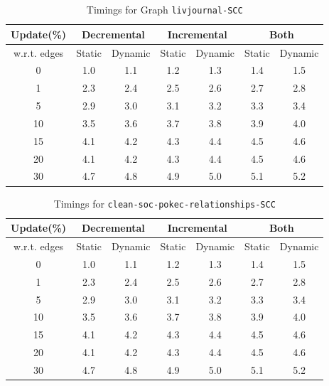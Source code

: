 \begin{table}[H]
    \centering
    \caption{Timings for Graph \texttt{livjournal-SCC} }
    \begin{tabular}{|c|c|c|c|c|c|c|}
        \hline
        \textbf{Update(\%)} & \multicolumn{2}{c|}{\textbf{Decremental}} & \multicolumn{2}{c|}{\textbf{Incremental}} & \multicolumn{2}{c|}{\textbf{Both}} \\
        \hline
        w.r.t. edges & Static &  Dynamic & Static & Dynamic & Static & Dynamic \\
        \hline
        0 & 1.0 & 1.1 & 1.2 & 1.3 & 1.4 & 1.5 \\
        1 & 2.3 & 2.4 & 2.5 & 2.6 & 2.7 & 2.8 \\
        5 & 2.9 & 3.0 & 3.1 & 3.2 & 3.3 & 3.4 \\
        10 & 3.5 & 3.6 & 3.7 & 3.8 & 3.9 & 4.0 \\
        15 & 4.1 & 4.2 & 4.3 & 4.4 & 4.5 & 4.6 \\
        20 & 4.1 & 4.2 & 4.3 & 4.4 & 4.5 & 4.6 \\
        30 & 4.7 & 4.8 & 4.9 & 5.0 & 5.1 & 5.2 \\
        \hline
    \end{tabular}
    \label{tab:timed_results_g4}
\end{table}

\begin{table}[H]
    \centering
    \caption{Timings for \texttt{clean-soc-pokec-relationships-SCC}}
    \begin{tabular}{|c|c|c|c|c|c|c|}
        \hline
        \textbf{Update(\%)} & \multicolumn{2}{c|}{\textbf{Decremental}} & \multicolumn{2}{c|}{\textbf{Incremental}} & \multicolumn{2}{c|}{\textbf{Both}} \\
        \hline
        w.r.t. edges & Static &  Dynamic & Static & Dynamic & Static & Dynamic \\
        \hline
        0 & 1.0 & 1.1 & 1.2 & 1.3 & 1.4 & 1.5 \\
        1 & 2.3 & 2.4 & 2.5 & 2.6 & 2.7 & 2.8 \\
        5 & 2.9 & 3.0 & 3.1 & 3.2 & 3.3 & 3.4 \\
        10 & 3.5 & 3.6 & 3.7 & 3.8 & 3.9 & 4.0 \\
        15 & 4.1 & 4.2 & 4.3 & 4.4 & 4.5 & 4.6 \\
        20 & 4.1 & 4.2 & 4.3 & 4.4 & 4.5 & 4.6 \\
        30 & 4.7 & 4.8 & 4.9 & 5.0 & 5.1 & 5.2 \\
        \hline
    \end{tabular}
    \label{tab:timed_results_g5}
\end{table}

